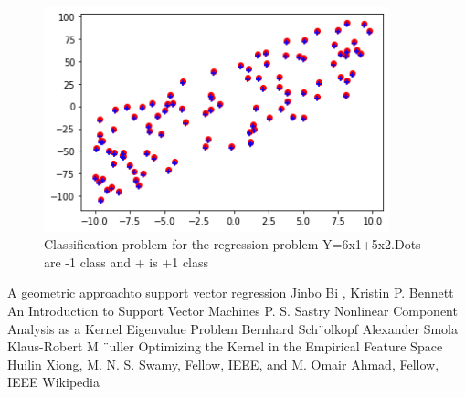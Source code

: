 \documentclass[../main.tex]{subfiles}
\begin{document}
    \begin{figure}[htp]
    \centering
    \includegraphics[width=10cm]{H11.png}
    \caption{Classification problem for the regression problem Y=6x1+5x2.Dots are -1 class and + is +1 class}
    \label{Classification problem for the regression problem Y=6x1+5x2}
    \end{figure}

    
    
	
	\begin{thebibliography}{10}
	A geometric approachto support vector
regression Jinbo Bi , Kristin P. Bennett 
	An Introduction to Support Vector Machines
P. S. Sastry
	Nonlinear Component Analysis as a Kernel Eigenvalue
Problem
Bernhard Sch¨olkopf
Alexander Smola
Klaus-Robert M ¨uller
Optimizing the Kernel in the Empirical Feature Space
Huilin Xiong, M. N. S. Swamy, Fellow, IEEE, and M. Omair Ahmad, Fellow, IEEE
Wikipedia

	\end{thebibliography}
\end{document}
